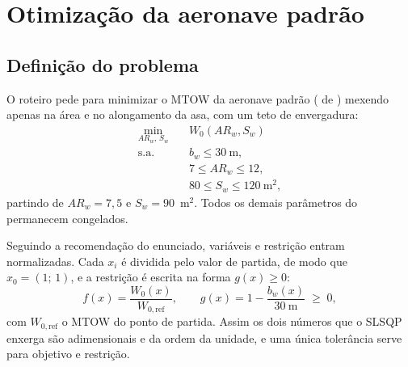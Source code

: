 
\section{Otimização da aeronave padrão}
\label{sec:aeronave-padrao}

\subsection{Definição do problema}
\label{sec:p2-def}

O roteiro pede para minimizar o MTOW da aeronave padrão
( de ) mexendo apenas na área
e no alongamento da asa, com um teto de envergadura:
\begin{equation}
\begin{aligned}
\min_{AR_w,\,S_w}\quad & W_0(AR_w, S_w) \\
\text{s.a.}\quad       & b_w \le 30~\mathrm{m}, \\
                       & 7 \le AR_w \le 12, \\
                       & 80 \le S_w \le 120~\mathrm{m^2},
\end{aligned}
\label{eq:p2}
\end{equation}
partindo de $AR_w = 7{,}5$ e $S_w = 90$~m$^2$. Todos os demais parâmetros
do  permanecem congelados.

Seguindo a recomendação do enunciado, variáveis e restrição entram
normalizadas. Cada $x_i$ é dividida pelo valor de partida, de modo que
$x_0 = (1;\,1)$, e a restrição é escrita na forma $g(x)\ge 0$:
\begin{equation}
f(x) = \frac{W_0(x)}{W_{0,\mathrm{ref}}},
\qquad
g(x) = 1 - \frac{b_w(x)}{30~\mathrm{m}} \;\ge\; 0 ,
\label{eq:p2norm}
\end{equation}
com $W_{0,\mathrm{ref}}$ o MTOW do ponto de partida. Assim os dois
números que o SLSQP enxerga são adimensionais e da ordem da unidade,
e uma única tolerância serve para objetivo e restrição.

